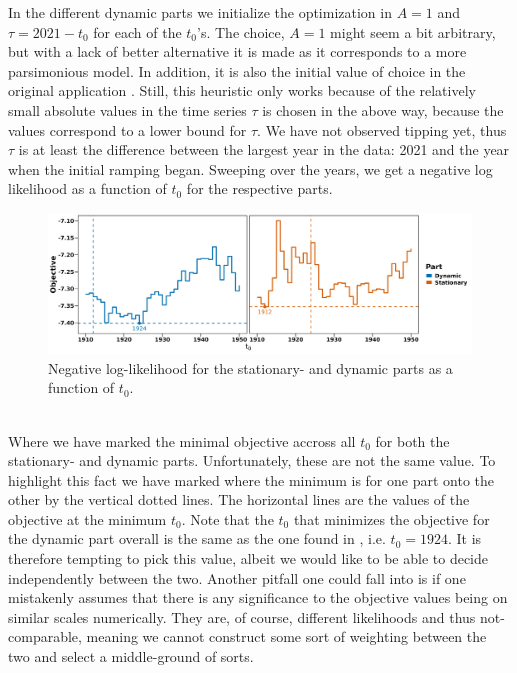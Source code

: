In the different dynamic parts we initialize the optimization in $A = 1$ and $\tau = 2021 - t_0$ for each of the $t_0$'s. The choice, $A = 1$ might seem a bit arbitrary, but with a lack of better alternative it is made as it corresponds to a more parsimonious model. In addition, it is also the initial value of choice in the original application \cite{Ditlevsen2023}. Still, this heuristic only works because of the relatively small absolute values in the time series $\tau$ is chosen in the above way, because the values correspond to a lower bound for $\tau$. We have not observed tipping yet, thus $\tau$ is at least the difference between the largest year in the data: 2021 and the year when the initial ramping began. Sweeping over the years, we get a negative log likelihood as a function of $t_0$ for the respective parts.
\begin{figure}[h!]
    \begin{center}
    \includegraphics[scale = .095]{figures/ramping_year_likelihood_plot.jpeg}
    \caption{Negative log-likelihood for the stationary- and dynamic parts as a function of $t_0$.}
    \label{figure:negLoglikRamping}        
    \end{center}
\end{figure}\\
Where we have marked the minimal objective accross all $t_0$ for both the stationary- and dynamic parts. Unfortunately, these are not the same value. To highlight this fact we have marked where the minimum is for one part onto the other by the vertical dotted lines. The horizontal lines are the values of the objective at the minimum $t_0$. Note that the $t_0$ that minimizes the objective for the dynamic part overall is the same as the one found in \cite{Ditlevsen2023}, i.e. $t_0 = 1924$. It is therefore tempting to pick this value, albeit we would like to be able to decide independently between the two. Another pitfall one could fall into is if one mistakenly assumes that there is any significance to the objective values being on similar scales numerically. They are, of course, different likelihoods and thus not-comparable, meaning we cannot construct some sort of weighting between the two and select a middle-ground of sorts.\\\\
